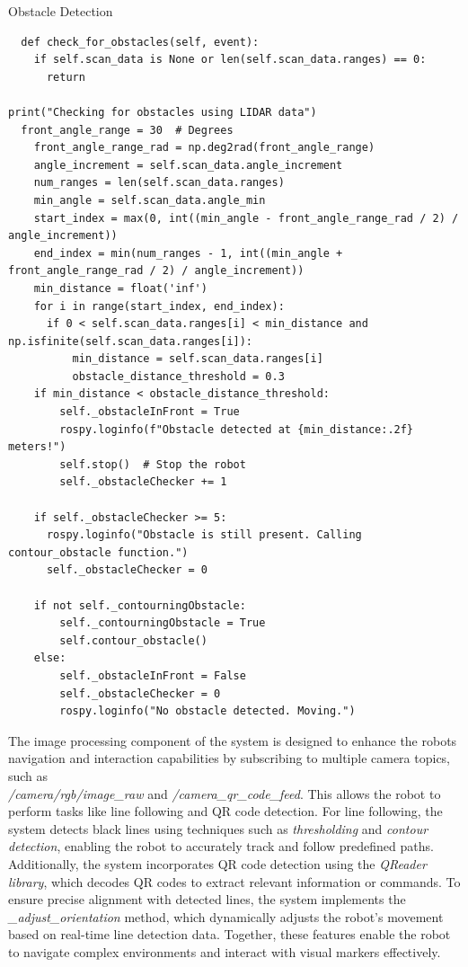 \documentclass[../../main]{subfiles}
\begin{document}
\begin{codebox}[label=judFig26]{Obstacle Detection}
  
\begin{verbatim}
  def check_for_obstacles(self, event):
    if self.scan_data is None or len(self.scan_data.ranges) == 0:
      return  

print("Checking for obstacles using LIDAR data")
  front_angle_range = 30  # Degrees
    front_angle_range_rad = np.deg2rad(front_angle_range)
    angle_increment = self.scan_data.angle_increment
    num_ranges = len(self.scan_data.ranges)
    min_angle = self.scan_data.angle_min
    start_index = max(0, int((min_angle - front_angle_range_rad / 2) / angle_increment))
    end_index = min(num_ranges - 1, int((min_angle + front_angle_range_rad / 2) / angle_increment))
    min_distance = float('inf')
    for i in range(start_index, end_index):
      if 0 < self.scan_data.ranges[i] < min_distance and np.isfinite(self.scan_data.ranges[i]):
          min_distance = self.scan_data.ranges[i]
          obstacle_distance_threshold = 0.3  
    if min_distance < obstacle_distance_threshold:
        self._obstacleInFront = True
        rospy.loginfo(f"Obstacle detected at {min_distance:.2f} meters!")
        self.stop()  # Stop the robot
        self._obstacleChecker += 1

    if self._obstacleChecker >= 5:
      rospy.loginfo("Obstacle is still present. Calling contour_obstacle function.")
      self._obstacleChecker = 0

    if not self._contourningObstacle:
        self._contourningObstacle = True
        self.contour_obstacle()
    else:
        self._obstacleInFront = False
        self._obstacleChecker = 0  
        rospy.loginfo("No obstacle detected. Moving.")
\end{verbatim}
\end{codebox}



The image processing component of the system is designed to enhance the
robot\textquotesingle s navigation and interaction capabilities by
subscribing to multiple camera topics, such as\\
\emph{/camera/rgb/image\_raw} and \emph{/camera\_qr\_code\_feed}. This
allows the robot to perform tasks like line following and QR code
detection. For line following, the system detects black lines using
techniques such as \emph{thresholding} and \emph{contour detection},
enabling the robot to accurately track and follow predefined paths.
Additionally, the system incorporates QR code detection using the
\emph{QReader library}, which decodes QR codes to extract relevant
information or commands. To ensure precise alignment with detected
lines, the system implements the \emph{\_adjust\_orientation} method,
which dynamically adjusts the robot's movement based on real-time line
detection data. Together, these features enable the robot to navigate
complex environments and interact with visual markers effectively.
\end{document}
